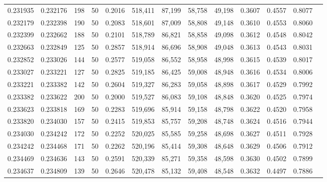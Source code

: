 \begin{tabular}{rrrrrrrrrrrrr}
0.231935 & 0.232176 &   198 &  50 &                                     0.2016 & 518,411 &  87,199 &  58,758 &  49,198 & 0.3607 & 0.4557 & 0.8077 \\
0.232179 & 0.232398 &   190 &  50 &                                     0.2083 & 518,601 &  87,009 &  58,808 &  49,148 & 0.3610 & 0.4553 & 0.8060 \\
0.232399 & 0.232662 &   188 &  50 &                                     0.2101 & 518,789 &  86,821 &  58,858 &  49,098 & 0.3612 & 0.4548 & 0.8042 \\
0.232663 & 0.232849 &   125 &  50 &                                     0.2857 & 518,914 &  86,696 &  58,908 &  49,048 & 0.3613 & 0.4543 & 0.8031 \\
0.232852 & 0.233026 &   144 &  50 &                                     0.2577 & 519,058 &  86,552 &  58,958 &  48,998 & 0.3615 & 0.4539 & 0.8017 \\
0.233027 & 0.233221 &   127 &  50 &                                     0.2825 & 519,185 &  86,425 &  59,008 &  48,948 & 0.3616 & 0.4534 & 0.8006 \\
0.233221 & 0.233382 &   142 &  50 &                                     0.2604 & 519,327 &  86,283 &  59,058 &  48,898 & 0.3617 & 0.4529 & 0.7992 \\
0.233382 & 0.233622 &   200 &  50 &                                     0.2000 & 519,527 &  86,083 &  59,108 &  48,848 & 0.3620 & 0.4525 & 0.7974 \\
0.233623 & 0.233818 &   169 &  50 &                                     0.2283 & 519,696 &  85,914 &  59,158 &  48,798 & 0.3622 & 0.4520 & 0.7958 \\
0.233820 & 0.234030 &   157 &  50 &                                     0.2415 & 519,853 &  85,757 &  59,208 &  48,748 & 0.3624 & 0.4516 & 0.7944 \\
0.234030 & 0.234242 &   172 &  50 &                                     0.2252 & 520,025 &  85,585 &  59,258 &  48,698 & 0.3627 & 0.4511 & 0.7928 \\
0.234242 & 0.234468 &   171 &  50 &                                     0.2262 & 520,196 &  85,414 &  59,308 &  48,648 & 0.3629 & 0.4506 & 0.7912 \\
0.234469 & 0.234636 &   143 &  50 &                                     0.2591 & 520,339 &  85,271 &  59,358 &  48,598 & 0.3630 & 0.4502 & 0.7899 \\
0.234637 & 0.234809 &   139 &  50 &                                     0.2646 & 520,478 &  85,132 &  59,408 &  48,548 & 0.3632 & 0.4497 & 0.7886 \\

\end{tabular}
